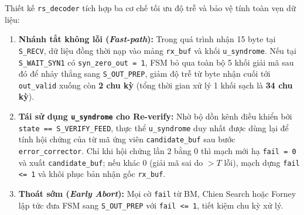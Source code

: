 \documentclass[11pt,a4paper]{report}
\begin{document}
Thiết kế \texttt{rs\_decoder} tích hợp ba cơ chế tối ưu độ trễ và bảo vệ tính toàn vẹn dữ liệu:
\begin{enumerate}
    \item \textbf{Nhánh tắt không lỗi (\textit{Fast-path}):} Trong quá trình nhận 15 byte tại \texttt{S\_RECV}, dữ liệu đồng thời nạp vào mảng \texttt{rx\_buf} và khối \texttt{u\_syndrome}. Nếu tại \texttt{S\_WAIT\_SYN1} có \texttt{syn\_zero\_out = 1}, FSM bỏ qua toàn bộ 5 khối giải mã sau đó để nhảy thẳng sang \texttt{S\_OUT\_PREP}, giảm độ trễ từ byte nhận cuối tới \texttt{out\_valid} xuống còn \textbf{2 chu kỳ} (tổng thời gian xử lý 1 khối sạch là \textbf{34 chu kỳ}).
    \item \textbf{Tái sử dụng \texttt{u\_syndrome} cho Re-verify:} Nhờ bộ dồn kênh điều khiển bởi \texttt{state == S\_VERIFY\_\allowbreak FEED}, thực thể \texttt{u\_\allowbreak syndrome} duy nhất được dùng lại để tính hội chứng của từ mã ứng viên \texttt{candidate\_buf} sau bước \texttt{error\_corrector}. Chỉ khi hội chứng lần 2 bằng 0 thì mạch mới hạ \texttt{fail = 0} và xuất \texttt{candidate\_buf}; nếu khác 0 (giải mã sai do $>T$ lỗi), mạch dựng \texttt{fail <= 1} và khôi phục bản nhận gốc \texttt{rx\_buf}.
    \item \textbf{Thoát sớm (\textit{Early Abort}):} Mọi cờ \texttt{fail} từ BM, Chien Search hoặc Forney lập tức đưa FSM sang \texttt{S\_OUT\_PREP} với \texttt{fail <= 1}, tiết kiệm chu kỳ xử lý.
\end{enumerate}
\end{document}
